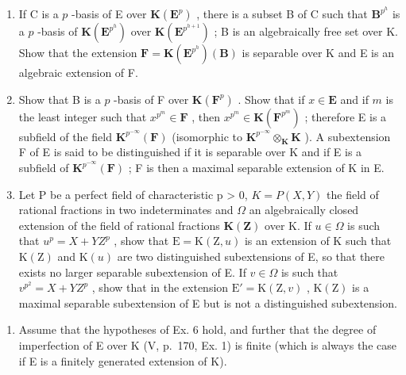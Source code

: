 \begin{enumerate}
\def\labelenumi{\alph{enumi})}
\item
  If C is a \(p\) -basis of E over \(\mathbf{K}(\mathbf{E}^p)\) , there is a subset B of C such that \(\mathbf{B}^{p^h}\) is a \(p\) -basis of \(\mathbf{K}(\mathbf{E}^{p^h})\) over \(\mathbf{K}(\mathbf{E}^{p^{h+1}})\) ; B is an algebraically free set over K. Show that the extension \(\mathbf{F} = \mathbf{K}(\mathbf{E}^{p^h})(\mathbf{B})\) is separable over K and E is an algebraic extension of F.
\item
  Show that B is a \(p\) -basis of F over \(\mathbf{K}(\mathbf{F}^p)\) . Show that if \(x \in \mathbf{E}\) and if \(m\) is the least integer such that \(x^{p^m} \in \mathbf{F}\) , then \(x^{p^m} \in \mathbf{K}(\mathbf{F}^{p^m})\) ; therefore E is a subfield of the field \(\mathbf{K}^{p^{-\infty}}(\mathbf{F})\) (isomorphic to \(\mathbf{K}^{p^{-\infty}} \otimes_{\mathbf{K}} \mathbf{K}\) ). A subextension F of E is said to be distinguished if it is separable over K and if E is a subfield of \(\mathbf{K}^{p^{-\infty}}(\mathbf{F})\) ; F is then a maximal separable extension of K in E.
\item
  Let P be a perfect field of characteristic p \textgreater{} 0, \(K = P(X, Y)\) the field of rational fractions in two indeterminates and \(\Omega\) an algebraically closed extension of the field of rational fractions \(\mathbf{K}(\mathbf{Z})\) over K. If \(u \in \Omega\) is such that \(u^{p} = X + YZ^{p}\) , show that \(\mathrm{E} = \mathrm{K}(\mathrm{Z}, u)\) is an extension of K such that \(\mathrm{K}(\mathrm{Z})\) and \(\mathrm{K}(u)\) are two distinguished subextensions of E, so that there exists no larger separable subextension of E. If \(v \in \Omega\) is such that \(v^{p^{2}} = X + YZ^{p}\) , show that in the extension \(\mathrm{E}' = \mathrm{K}(\mathrm{Z}, v)\) , \(\mathrm{K}(\mathrm{Z})\) is a maximal separable subextension of E but is not a distinguished subextension.
\end{enumerate}

\begin{enumerate}
\def\labelenumi{\arabic{enumi})}
\setcounter{enumi}{6}
\tightlist
\item
  Assume that the hypotheses of Ex. 6 hold, and further that the degree of imperfection of E over K (V, p.~170, Ex. 1) is finite (which is always the case if E is a finitely generated extension of K).
\end{enumerate}

